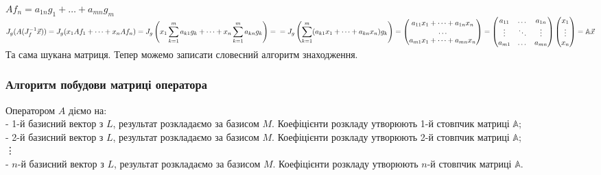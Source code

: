 \documentclass[a4paper, 10pt]{article}
\theoremstyle{theoremdd}
\begin{document}
	$Af_n = a_{1n}g_1 + \dots + a_{mn}g_m$\\
	$J_g(A(J_f^{-1}\vec{x})) = J_g(x_1Af_1 + \dots + x_nAf_n) = \displaystyle J_g\left(x_1 \sum_{k=1}^m a_{k1}g_k + \dots + x_n \sum_{k=1}^m a_{kn}g_k\right) = \\ = J_g\left(\sum_{k=1}^m (a_{k1}x_1 + \dots + a_{kn}x_n)g_k \right) = \begin{pmatrix}
	a_{11}x_1 + \dots + a_{1n}x_n \\
	\dots \\
	a_{m1}x_1 + \dots + a_{mn}x_n \\
	\end{pmatrix} = \begin{pmatrix}
	a_{11} & \dots & a_{1n} \\
	\vdots & \ddots & \vdots \\
	a_{m1} & \dots & a_{mn}
	\end{pmatrix} \begin{pmatrix}
	x_1 \\ \vdots \\ x_n
	\end{pmatrix} = \mathbb{A}\vec{x}$\\
	Та сама шукана матриця. Тепер можемо записати словесний алгоритм знаходження.
	
	\subsubsection*{Алгоритм побудови матриці оператора}
	Оператором $A$ діємо на:\\
	- 1-й базисний вектор з $L$, результат розкладаємо за базисом $M$. Коефіцієнти розкладу утворюють 1-й стовпчик матриці $\mathbb{A}$;\\
	- 2-й базисний вектор з $L$, результат розкладаємо за базисом $M$. Коефіцієнти розкладу утворюють 2-й стовпчик матриці $\mathbb{A}$;\\
	\vdots \\
	- $n$-й базисний вектор з $L$, результат розкладаємо за базисом $M$. Коефіцієнти розкладу утворюють $n$-й стовпчик матриці $\mathbb{A}$.
	
\end{document}
